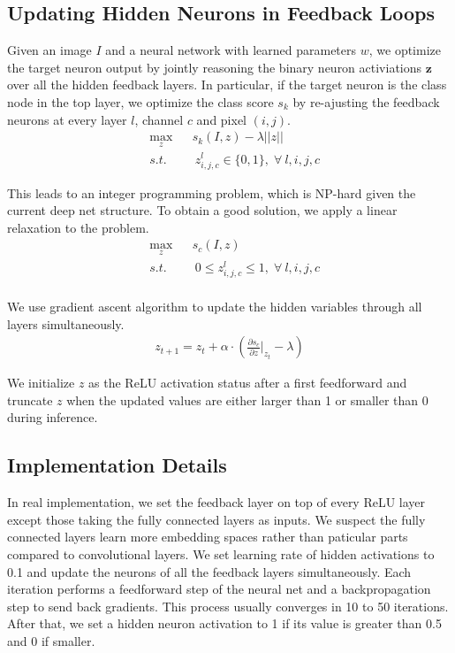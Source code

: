\subsection{Updating Hidden Neurons in Feedback Loops}
Given an image $I$ and a neural network with learned parameters $w$, we optimize the target neuron output by jointly reasoning the binary neuron activiations $\mathbf{z}$ over all the hidden feedback layers. In particular, if the target neuron is the class node in the top layer, we optimize the class score $s_k$ by re-ajusting the feedback neurons at every layer $l$, channel $c$ and pixel $(i,j)$.
\begin{equation}
\begin{aligned}
& \max_z & & s_k(I, z) - \lambda ||z|| \\
& s.t. & & \ z^l_{i,j,c} \in \{0, 1\}, \; \forall\ l, i, j, c
\end{aligned}
\end{equation}

This leads to an integer programming problem, which is NP-hard given the current deep net structure. To obtain a good solution, we apply a linear relaxation to the problem.
\begin{equation}
\begin{aligned}
& \max_z & & s_c(I, z) \\
& s.t. & & \ 0 \leq z^l_{i,j,c} \leq 1, \; \forall\ l, i, j, c\\
\end{aligned}
\end{equation}

We use gradient ascent algorithm to update the hidden variables through all layers simultaneously.
\begin{equation}
\begin{aligned}
z_{t+1} = z_t + \alpha \cdot (\frac{\partial s_c}{\partial z} |_{z_t} - \lambda)
\end{aligned}
\end{equation}

We initialize $z$ as the ReLU activation status after a first feedforward and truncate $z$ when the updated values are either larger than 1 or smaller than 0 during inference.

\subsection{Implementation Details}
In real implementation, we set the feedback layer on top of every ReLU layer except those taking the fully connected layers as inputs. We suspect the fully connected layers learn more embedding spaces rather than paticular parts compared to convolutional layers. We set learning rate of hidden activations to 0.1 and update the neurons of all the feedback layers simultaneously. Each iteration performs a feedforward step of the neural net and a backpropagation step to send back gradients. This process usually converges in 10 to 50 iterations. After that, we set a hidden neuron activation to 1 if its value is greater than 0.5 and 0 if smaller.
